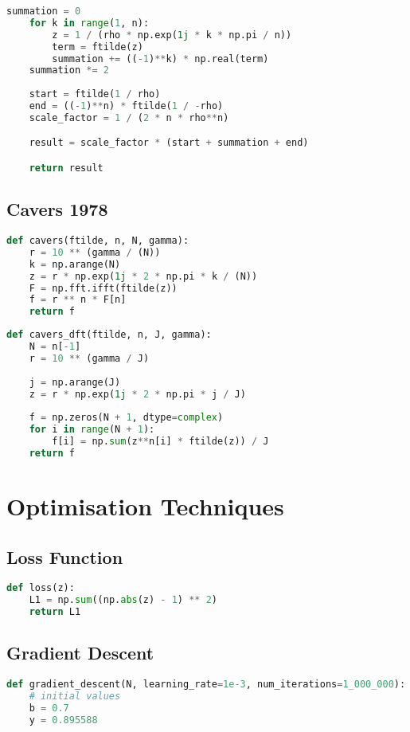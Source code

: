 \begin{appendices}
\begin{lstlisting}[language=Python, caption= null ]
    summation = 0
    for k in range(1, n):
        z = 1 / (rho * np.exp(1j * k * np.pi / n))
        term = ftilde(z)
        summation += ((-1)**k) * np.real(term)
    summation *= 2
    
    start = ftilde(1 / rho)
    end = ((-1)**n) * ftilde(1 / -rho)
    scale_factor = 1 / (2 * n * rho**n)

    result = scale_factor * (start + summation + end)

    return result
\end{lstlisting}

\subsection{Cavers 1978}
\begin{lstlisting}[language=Python, caption= null]
def cavers(ftilde, n, N, gamma):
    r = 10 ** (gamma / (N))
    k = np.arange(N)
    z = r * np.exp(1j * 2 * np.pi * k / (N))
    F = np.fft.ifft(ftilde(z))
    f = r ** n * F[n]
    return f
\end{lstlisting}

\begin{lstlisting}[language=Python, caption= null]
def cavers_dft(ftilde, n, J, gamma):
    N = n[-1]
    r = 10 ** (gamma / J)
    
    j = np.arange(J) 
    z = r * np.exp(1j * 2 * np.pi * j / J)
    
    f = np.zeros(N + 1, dtype=complex)
    for i in range(N + 1):
        f[i] = np.sum(z**n[i] * ftilde(z)) / J
    return f
\end{lstlisting}

\newpage
\section{Optimisation Techniques}

\subsection{Loss Function}
\begin{lstlisting}[language=Python, caption= null]
def loss(z):
    L1 = np.sum((np.abs(z) - 1) ** 2)
    return L1
\end{lstlisting}

\subsection{Gradient Descent}
\begin{lstlisting}[language=Python, caption= null]
def gradient_descent(N, learning_rate=1e-3, num_iterations=1_000_000):
	# initial values
    b = 0.7
    y = 0.895588
    

\end{lstlisting}
\end{appendices}
